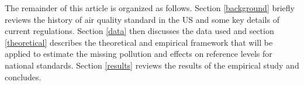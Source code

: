 


The remainder of this article is organized as follows. Section \ref{background} briefly reviews the history of air quality standard in the US and some key details of current regulations. Section \ref{data} then discusses the data used and section \ref{theoretical} describes the theoretical and empirical framework that will be applied to estimate the missing pollution and effects on reference levels for national standards. Section \ref{results} reviews the results of the empirical study and concludes.